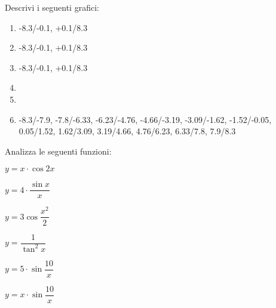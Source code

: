 \bigskip

\begin{esercizio}\label{ese:stufun.7g}
Descrivi i seguenti grafici:
\begin{multicols}{2}
 \begin{enumerate} [left=0pt, label=\alph*)]
  \item \myp 
{}
{-8.3/-0.1, +0.1/8.3} %
  \item \myp 
{} 
{-8.3/-0.1, +0.1/8.3} %
  \item \myp 
{} 
{-8.3/-0.1, +0.1/8.3} %
\vspace{1mm}
  \item \myp 
{} %
  \item \myp 
{} %
  \item \myp 
{}
{-8.3/-7.9, -7.8/-6.33, -6.23/-4.76, -4.66/-3.19, -3.09/-1.62, -1.52/-0.05, 
 0.05/1.52, 1.62/3.09, 3.19/4.66, 4.76/6.23, 6.33/7.8, 7.9/8.3} %
 \end{enumerate}
\end{multicols}
\end{esercizio}

\begin{esercizio}\label{ese:stufun.7e}
Analizza le seguenti funzioni:
\begin{multicols}{3}
 \begin{enumeratea}
  \item \(y = x \cdot \cos 2x\) \\ [.5em] %
  \item \(y = 4 \cdot \dfrac{\sin x}{x}\) %
  \item \(y = 3 \cos {\dfrac{x^2}{2}}\) \\ %
  \item \(y = \dfrac{1}{\tan^2 x}\) %
  \item \(y = 5 \cdot \sin \dfrac{10}{x}\) \\ %
  \item \(y = x \cdot \sin \dfrac{10}{x}\) %
 \end{enumeratea}
\end{multicols}
\end{esercizio}



